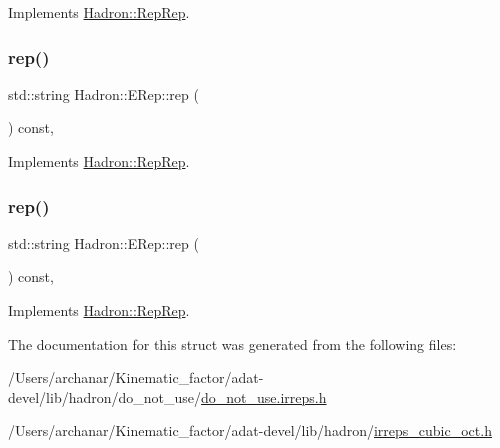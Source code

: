 Implements \mbox{\hyperlink{structHadron_1_1RepRep_ab3213025f6de249f7095892109575fde}{Hadron\+::\+Rep\+Rep}}.

\mbox{\label{structHadron_1_1ERep_a388db41e3463a65498dca9ba2e1b7960}} 
\subsubsection{\texorpdfstring{rep()}{rep()}\hspace{0.1cm}{\footnotesize\ttfamily [4/5]}}
{\footnotesize\ttfamily std\+::string Hadron\+::\+E\+Rep\+::rep (\begin{DoxyParamCaption}{ }\end{DoxyParamCaption}) const\hspace{0.3cm}{\ttfamily [inline]}, {\ttfamily [virtual]}}



Implements \mbox{\hyperlink{structHadron_1_1RepRep_ab3213025f6de249f7095892109575fde}{Hadron\+::\+Rep\+Rep}}.

\mbox{\label{structHadron_1_1ERep_a388db41e3463a65498dca9ba2e1b7960}} 
\subsubsection{\texorpdfstring{rep()}{rep()}\hspace{0.1cm}{\footnotesize\ttfamily [5/5]}}
{\footnotesize\ttfamily std\+::string Hadron\+::\+E\+Rep\+::rep (\begin{DoxyParamCaption}{ }\end{DoxyParamCaption}) const\hspace{0.3cm}{\ttfamily [inline]}, {\ttfamily [virtual]}}



Implements \mbox{\hyperlink{structHadron_1_1RepRep_ab3213025f6de249f7095892109575fde}{Hadron\+::\+Rep\+Rep}}.



The documentation for this struct was generated from the following files\+:\begin{DoxyCompactItemize}
\item 
/\+Users/archanar/\+Kinematic\+\_\+factor/adat-\/devel/lib/hadron/do\+\_\+not\+\_\+use/\mbox{\hyperlink{adat-devel_2lib_2hadron_2do__not__use_2do__not__use_8irreps_8h}{do\+\_\+not\+\_\+use.\+irreps.\+h}}\item 
/\+Users/archanar/\+Kinematic\+\_\+factor/adat-\/devel/lib/hadron/\mbox{\hyperlink{adat-devel_2lib_2hadron_2irreps__cubic__oct_8h}{irreps\+\_\+cubic\+\_\+oct.\+h}}\end{DoxyCompactItemize}
